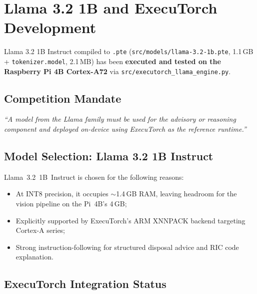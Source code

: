 \documentclass[12pt,a4paper]{article}
\begin{document}
\clearpage

\section{Llama 3.2 1B and ExecuTorch Development}

\begin{verifiedbox}
Llama 3.2 1B Instruct compiled to \texttt{.pte} (\texttt{src/models/llama-3.2-1b.pte},
1.1\,GB + \texttt{tokenizer.model}, 2.1\,MB) has been \textbf{executed and tested on the
Raspberry Pi 4B Cortex-A72} via \texttt{src/executorch\_llama\_engine.py}.
\end{verifiedbox}

\subsection{Competition Mandate}

\begin{reqbox}
\textit{``A model from the Llama family must be used for the advisory or reasoning
component and deployed on-device using ExecuTorch as the reference runtime.''}
\end{reqbox}

\subsection{Model Selection: Llama 3.2 1B Instruct}

Llama~3.2~1B~Instruct is chosen for the following reasons:
\begin{itemize}
  \item At INT8 precision, it occupies $\sim$1.4\,GB RAM, leaving headroom for the
  vision pipeline on the Pi~4B's 4\,GB;
  \item Explicitly supported by ExecuTorch's ARM XNNPACK backend targeting Cortex-A series;
  \item Strong instruction-following for structured disposal advice and RIC code explanation.
\end{itemize}

\subsection{ExecuTorch Integration Status}
\end{document}
